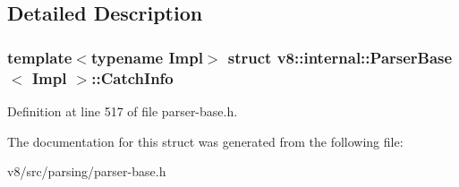 \subsection{Detailed Description}
\subsubsection*{template$<$typename Impl$>$\newline
struct v8\+::internal\+::\+Parser\+Base$<$ Impl $>$\+::\+Catch\+Info}



Definition at line 517 of file parser-\/base.\+h.



The documentation for this struct was generated from the following file\+:\begin{DoxyCompactItemize}
\item 
v8/src/parsing/parser-\/base.\+h\end{DoxyCompactItemize}
